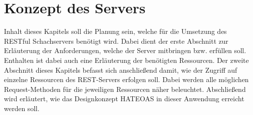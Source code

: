 
\chapter{Konzept des Servers}\label{sec:conceptServer}
Inhalt dieses Kapitels soll die Planung sein, welche für die Umsetzung des RESTful Schachservers benötigt wird. Dabei dient der erste Abschnitt zur Erläuterung der Anforderungen, welche der Server mitbringen bzw. erfüllen soll. Enthalten ist dabei auch eine Erläuterung der benötigten Ressourcen. Der zweite Abschnitt dieses Kapitels befasst sich anschließend damit, wie der Zugriff auf einzelne Ressourcen des \gls{REST}-Servers erfolgen soll. Dabei werden alle möglichen Request-Methoden für die jeweiligen Ressourcen näher beleuchtet. Abschließend wird erläutert, wie das Designkonzept HATEOAS in dieser Anwendung erreicht werden soll.

